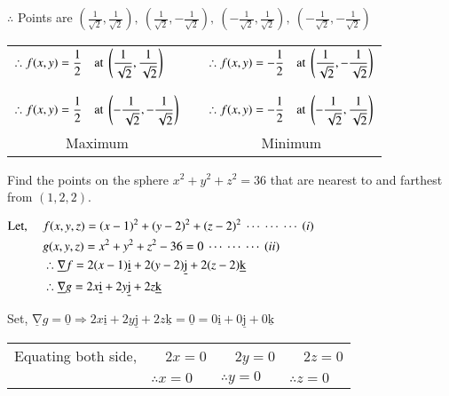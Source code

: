 \documentclass[12pt]{article}
\renewcommand{\vec}[1]{\underline{\mathrm{#1}}}
\begin{document}
$\therefore$ Points are
$\left(\frac{1}{\sqrt{2}},\frac{1}{\sqrt{2}}\right), \ 
\left(\frac{1}{\sqrt{2}},-\frac{1}{\sqrt{2}}\right), \ 
\left(-\frac{1}{\sqrt{2}},\frac{1}{\sqrt{2}}\right), \ 
\left(-\frac{1}{\sqrt{2}},-\frac{1}{\sqrt{2}}\right)$

\begin{tabular}{lcl}
   $\begin{aligned}
      \therefore f(x,y) &= \frac{1}{2} \text{ \ \ \ at }
      \left(\frac{1}{\sqrt{2}},\frac{1}{\sqrt{2}}\right)\\[2ex]
      \therefore f(x,y) &= \frac{1}{2} \text{ \ \ \ at }
      \left(-\frac{1}{\sqrt{2}},-\frac{1}{\sqrt{2}}\right)\\
   \end{aligned}$
   & \divideX &
   $\begin{aligned}
      \therefore f(x,y) &= -\frac{1}{2} \text{ \ \ \ at }
      \left(\frac{1}{\sqrt{2}},-\frac{1}{\sqrt{2}}\right)\\[2ex]
      \therefore f(x,y) &= -\frac{1}{2} \text{ \ \ \ at }
      \left(-\frac{1}{\sqrt{2}},\frac{1}{\sqrt{2}}\right)\\
   \end{aligned}$\\[1ex]
   \multicolumn{1}{c}{Maximum}&&
   \multicolumn{1}{c}{Minimum}
   \end{tabular}


\vspace{4ex}
\textbf{} Find the points on the sphere $x^2+y^2+z^2=36$ that are nearest to and farthest from $(1,2,2)$.


\Heading{Solution:}
$\begin{aligned}
   \text{Let, }\quad 
   & f(x,y,z) = (x-1)^2+(y-2)^2+(z-2)^2 \seteqno{i}\\
   & g(x,y,z) = x^2+y^2+z^2-36=0 \seteqno{ii}\\
   & \therefore \vec{\nabla} f = 2(x-1) \vec{i}+2(y-2) \vec{j}+2(z-2) \vec{k} \\
   & \therefore \vec{\nabla} g = 2 x \vec{i}+2 y \vec{j}+2 z \vec{k}
\end{aligned}$

\vspace{2ex}
Set, $\vec{\nabla} g = \vec{0} \Rightarrow 2 x \vec{i}+2 y \vec{j}+2 z \vec{k}= \vec{0} = 0 \vec{i}+0 \vec{j}+0 \vec{k}$

\vspace{2ex}
\begin{tabular}{llll}
   Equating both side,&
   \ \ $2x=0$ & \ \ $2y=0$ & \ \ $2z=0$\\[-1ex]
   &$\therefore x=0$ & $\therefore y=0$ & $\therefore z=0$\\
\end{tabular}
\end{document}
